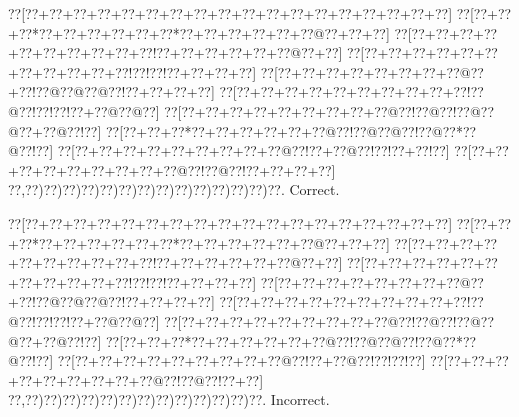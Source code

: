\documentclass[a5paper]{article}
\begin{document}
\begin{center}
{\goo
\0??[\0??+\0??+\0??+\0??+\0??+\0??+\0??+\0??+\0??+\0??+\0??+\0??+\0??+\0??+\0??+\0??+\0??+\0??]
\0??[\0??+\0??+\0??*\0??+\0??+\0??+\0??+\0??+\0??*\0??+\0??+\0??+\0??+\0??+\0??@\0??+\0??+\0??]
\0??[\0??+\0??+\0??+\0??+\0??+\0??+\0??+\0??+\0??+\0??!\0??+\0??+\0??+\0??+\0??+\0??@\0??+\0??]
\0??[\0??+\0??+\0??+\0??+\0??+\0??+\0??+\0??+\0??+\0??+\0??!\0??!\0??!\0??+\0??+\0??+\0??]
\0??[\0??+\0??+\0??+\0??+\0??+\0??+\0??+\0??@\0??+\0??!\0??@\0??@\0??@\0??!\0??+\0??+\0??+\0??]
\0??[\0??+\0??+\0??+\0??+\0??+\0??+\0??+\0??+\0??+\0??!\0??@\0??!\0??!\0??!\0??+\0??@\0??@\0??]
\0??[\0??+\0??+\0??+\0??+\0??+\0??+\0??+\0??+\0??@\0??!\0??@\0??!\0??@\0??@\0??+\0??@\0??!\0??]
\0??[\0??+\0??+\0??*\0??+\0??+\0??+\0??+\0??+\0??@\0??!\0??@\0??@\0??!\0??@\0??*\0??@\0??!\0??]
\0??[\0??+\0??+\0??+\0??+\0??+\0??+\0??+\0??+\0??@\0??!\0??+\0??@\0??!\0??!\0??+\0??!\0??]
\0??[\0??+\0??+\0??+\0??+\0??+\0??+\0??+\0??+\0??@\0??!\0??@\0??!\0??+\0??+\0??+\0??]
\0??,\0??)\0??)\0??)\0??)\0??)\0??)\0??)\0??)\0??)\0??)\0??)\0??)\0??)\0??.
}
Correct. 

\end{center}
\begin{center}
{\goo
\0??[\0??+\0??+\0??+\0??+\0??+\0??+\0??+\0??+\0??+\0??+\0??+\0??+\0??+\0??+\0??+\0??+\0??+\0??]
\0??[\0??+\0??+\0??*\0??+\0??+\0??+\0??+\0??+\0??*\0??+\0??+\0??+\0??+\0??+\0??@\0??+\0??+\0??]
\0??[\0??+\0??+\0??+\0??+\0??+\0??+\0??+\0??+\0??+\0??!\0??+\0??+\0??+\0??+\0??+\0??@\0??+\0??]
\0??[\0??+\0??+\0??+\0??+\0??+\0??+\0??+\0??+\0??+\0??+\0??!\0??!\0??!\0??+\0??+\0??+\0??]
\0??[\0??+\0??+\0??+\0??+\0??+\0??+\0??+\0??@\0??+\0??!\0??@\0??@\0??@\0??!\0??+\0??+\0??+\0??]
\0??[\0??+\0??+\0??+\0??+\0??+\0??+\0??+\0??+\0??+\0??!\0??@\0??!\0??!\0??!\0??+\0??@\0??@\0??]
\0??[\0??+\0??+\0??+\0??+\0??+\0??+\0??+\0??+\0??@\0??!\0??@\0??!\0??@\0??@\0??+\0??@\0??!\0??]
\0??[\0??+\0??+\0??*\0??+\0??+\0??+\0??+\0??+\0??@\0??!\0??@\0??@\0??!\0??@\0??*\0??@\0??!\0??]
\0??[\0??+\0??+\0??+\0??+\0??+\0??+\0??+\0??+\0??@\0??!\0??+\0??@\0??!\0??!\0??!\0??]
\0??[\0??+\0??+\0??+\0??+\0??+\0??+\0??+\0??+\0??@\0??!\0??@\0??!\0??+\0??]
\0??,\0??)\0??)\0??)\0??)\0??)\0??)\0??)\0??)\0??)\0??)\0??)\0??)\0??.
}
Incorrect. 

\end{center}
\newpage
\end{document}
